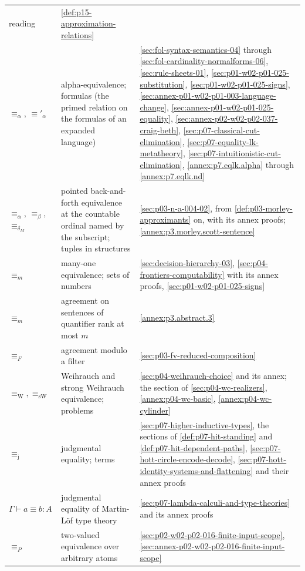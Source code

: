 \begin{longtable}{@{}p{}p{}p{}@{}}
reading &
\cref{def:p15-approximation-relations} \\
\(\equiv_\alpha\), \(\equiv'_\alpha\) & alpha-equivalence; formulas (the
primed relation on the formulas of an expanded language) &
\cref{sec:fol-syntax-semantics-04} through
\cref{sec:fol-cardinality-normalforms-06}, \cref{sec:rule-sheets-01},
\cref{sec:p01-w02-p01-025-substitution}, \cref{sec:p01-w02-p01-025-signs},
\cref{sec:annex-p01-w02-p01-003-language-change},
\cref{sec:annex-p01-w02-p01-025-equality},
\cref{sec:annex-p02-w02-p02-037-craig-beth},
\cref{sec:p07-classical-cut-elimination},
\cref{sec:p07-equality-lk-metatheory},
\cref{sec:p07-intuitionistic-cut-elimination}, \cref{annex:p7.eqlk.alpha}
through \cref{annex:p7.eqlk.nd} \\
\(\equiv_\alpha\), \(\equiv_\beta\), \(\equiv_{\delta_M}\) & pointed
back-and-forth equivalence at the countable ordinal named by the subscript;
tuples in structures & \cref{sec:p03-n-a-004-02}, from
\cref{def:p03-morley-approximants} on, with its annex proofs;
\cref{annex:p3.morley.scott-sentence} \\
\(\equiv_m\) & many-one equivalence; sets of numbers &
\cref{sec:decision-hierarchy-03}, \cref{sec:p04-frontiers-computability}
with its annex proofs, \cref{sec:p01-w02-p01-025-signs} \\
\(\equiv_m\) & agreement on sentences of quantifier rank at most \(m\) &
\cref{annex:p3.abstract.3} \\
\(\equiv_F\) & agreement modulo a filter & \cref{sec:p03-fv-reduced-composition} \\
\(\equiv_{\mathrm W},\equiv_{\mathrm{sW}}\) & Weihrauch and strong Weihrauch
equivalence; problems & \cref{sec:p04-weihrauch-choice} and its annex; the
section of \cref{sec:p04-wc-realizers}, \cref{annex:p04-wc-basic},
\cref{annex:p04-wc-cylinder} \\
\(\equiv_{\mathrm j}\) & judgmental equality; terms &
\cref{sec:p07-higher-inductive-types}, the sections of
\cref{def:p07-hit-standing} and \cref{def:p07-hit-dependent-paths},
\cref{sec:p07-hott-circle-encode-decode},
\cref{sec:p07-hott-identity-systems-and-flattening} and their annex proofs \\
\(\Gamma\vdash a\equiv b:A\) & judgmental equality of Martin-L\"of type
theory & \cref{sec:p07-lambda-calculi-and-type-theories} and its annex
proofs \\
\(\equiv_P\) & two-valued equivalence over arbitrary atoms &
\cref{sec:p02-w02-p02-016-finite-input-scope},
\cref{sec:annex-p02-w02-p02-016-finite-input-scope} \\

\end{longtable}
